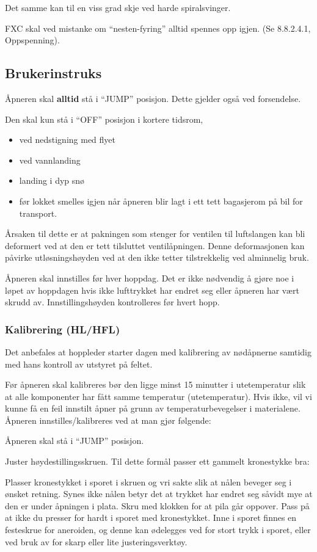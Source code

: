 Det samme kan til en viss grad skje ved harde spiralsvinger.

FXC skal ved mistanke om ``nesten-fyring'' alltid spennes opp igjen. (Se 8.8.2.4.1, Oppspenning).

\subsection{Brukerinstruks}
Åpneren skal \textbf{alltid} stå i ``JUMP'' posisjon. Dette gjelder også ved forsendelse.

Den skal kun stå i ``OFF'' posisjon i kortere tidsrom,
\begin{itemize}
\item ved nedstigning med flyet
\item ved vannlanding
\item landing i dyp snø
\item før lokket smelles igjen når åpneren blir lagt i ett tett bagasjerom på bil for transport.
\end{itemize}

Årsaken til dette er at pakningen som stenger for ventilen til luftslangen kan bli deformert ved at den er tett tilsluttet ventilåpningen. Denne deformasjonen kan påvirke utløsningshøyden ved at den ikke tetter tilstrekkelig ved alminnelig bruk.

Åpneren skal innstilles før hver hoppdag. Det er ikke nødvendig å gjøre noe i løpet av hoppdagen hvis ikke lufttrykket har endret seg eller åpneren har vært skrudd av. Innstillingshøyden kontrolleres før hvert hopp.

\subsubsection{Kalibrering (HL/HFL)}
Det anbefales at hoppleder starter dagen med kalibrering av nødåpnerne samtidig med hans kontroll av utstyret på feltet.

Før åpneren skal kalibreres bør den ligge minst 15 minutter i utetemperatur slik at alle komponenter har fått samme temperatur (utetemperatur). Hvis ikke, vil vi kunne få en feil innstilt åpner på grunn av temperaturbevegelser i materialene. Åpneren innstilles/kalibreres ved at man gjør følgende:

Åpneren skal stå i ``JUMP'' posisjon.

Juster høydestillingsskruen. Til dette formål passer ett gammelt kronestykke bra:

Plasser kronestykket i sporet i skruen og vri sakte slik at nålen beveger seg i ønsket retning. Synes ikke nålen betyr det at trykket har endret seg såvidt mye at den er under åpningen i plata. Skru med klokken for at pila går oppover. Pass på at ikke du presser for hardt i sporet med kronestykket. Inne i sporet finnes en festeskrue for aneroiden, og denne kan ødelegges ved for stort trykk i sporet, eller ved bruk av for skarp eller lite justeringsverktøy.


